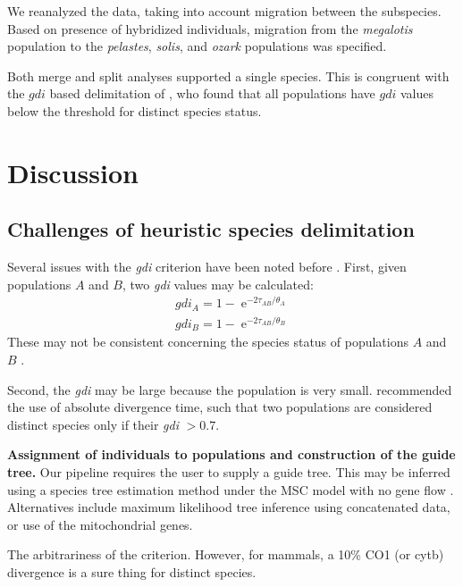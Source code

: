 \documentclass[A4]{article1}
\DeclareMathOperator{\e}{\mathrm{e}}
\begin{document}
We reanalyzed the data, taking into account migration between the subspecies.  Based on
presence of hybridized individuals, migration from the \textit{megalotis} population to
the \textit{pelastes}, \textit{solis}, and \textit{ozark} populations was specified.

Both merge and split analyses supported a single species.  This is congruent with the $gdi$
based delimitation of \citet{Kim2022}, who found that all populations have $gdi$ values
below the threshold for distinct species status.



\section{Discussion}

\subsection{Challenges of heuristic species delimitation}

Several issues with the \textit{gdi} criterion have been noted before \citep{Leache2019}.  
First, given populations $A$ and $B$, two \textit{gdi} values may be calculated:
\begin{equation}
   \begin{aligned}
      gdi_A = 1 - \e^{-2\tau _{AB}/\theta_A} \\
      gdi_B = 1 - \e^{-2\tau _{AB}/\theta_B}
   \end{aligned}
\end{equation}
These may not be consistent concerning the species status of populations $A$ and $B$
\citep{Leache2019}.

Second, the \textit{gdi} may be large because the population is very small.
\citet{Rannala2020} recommended the use of absolute divergence time, such that two
populations are considered distinct species only if their \textit{gdi} $> 0.7$.

\textbf{Assignment of individuals to populations and construction of the guide tree.}
Our pipeline requires the user to supply a guide tree.  This may be inferred using a
species tree estimation method under the MSC model with no gene flow \citep{Yang2014,
   Rannala2017}.  Alternatives include maximum likelihood tree inference using concatenated
data, or use of the mitochondrial genes.

The arbitrariness of the criterion.  However, for mammals, a 10\% CO1 (or cytb)
divergence is a sure thing for distinct species.
\end{document}
